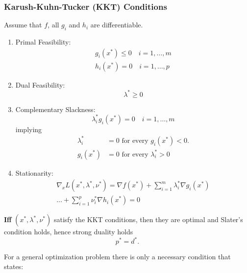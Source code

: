\subsubsection{Karush-Kuhn-Tucker (KKT) Conditions}

Assume that $f$, all $g_i$ and $h_i$ are differentiable.
\begin{enumerate}
    \item Primal Feasibility:
          \begin{gather*}
              g_i(x^*) \leq 0 \quad i = 1, \ldots, m \\
              h_i(x^*) = 0 \quad i = 1, \ldots, p
          \end{gather*}
    \item Dual Feasibility:
          \begin{equation*}
              \lambda^* \geq 0
          \end{equation*}
    \item Complementary Slackness:
          \begin{equation*}
              \lambda_i^*g_i(x^*)=0 \quad i = 1, \ldots, m
          \end{equation*}
          implying
          \begin{align*}
              \lambda_{i}^{*} & =0\text{ for every }g_{i}(x^{*})<0.   \\
              g_{i}(x^{*})    & =0\text{ for every }\lambda_{i}^{*}>0
          \end{align*}
    \item Stationarity:
          \begin{align*}
              \nabla_x L(x^*, \lambda^*, \nu^*) =\nabla f(x^*) +\sum_{i=1}^{m}\lambda_i^*\nabla g_i(x^*) \\
              \ldots+\sum_{i=1}^{p}\nu_i^*\nabla h_i(x^*) = 0
          \end{align*}
\end{enumerate}

\newpar{}

\textbf{Iff} $(x^*,\lambda^*,\nu^*)$ satisfy the KKT conditions, then they are optimal and Slater's condition holds, hence strong duality holds\begin{equation*}
    p^*=d^*.
\end{equation*}

\newpar{}

For a general optimization problem there is only a necessary condition that states:

